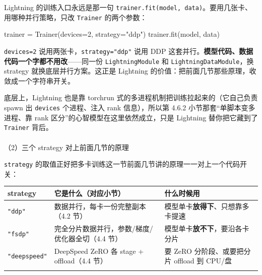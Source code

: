 \documentclass[
  chinese,
]{ctexart}
\makeatletter
\let\oldparagraph\paragraph
\renewcommand{\paragraph}{
    \@ifstar
      \xxxParagraphStar
      \xxxParagraphNoStar
  }
\newcommand{\xxxParagraphStar}[1]{\oldparagraph*{#1}\mbox{}}
\newcommand{\xxxParagraphNoStar}[1]{\oldparagraph{#1}\mbox{}}
\newenvironment{Shaded}{\begin{snugshade}}{\end{snugshade}}
\newcommand{\DecValTok}[1]{\textcolor[rgb]{0.68,0.00,0.00}{#1}}
\newcommand{\NormalTok}[1]{\textcolor[rgb]{0.00,0.23,0.31}{#1}}
\newcommand{\OperatorTok}[1]{\textcolor[rgb]{0.37,0.37,0.37}{#1}}
\newcommand{\StringTok}[1]{\textcolor[rgb]{0.13,0.47,0.30}{#1}}
\makeatother
\begin{document}
Lightning 的训练入口永远是那一句
\texttt{trainer.fit(model,\ data)}。要用几张卡、用哪种并行策略，只改
\texttt{Trainer} 的两个参数：

\begin{Shaded}
\begin{Highlighting}[]
\NormalTok{trainer }\OperatorTok{=}\NormalTok{ Trainer(devices}\OperatorTok{=}\DecValTok{2}\NormalTok{, strategy}\OperatorTok{=}\StringTok{"ddp"}\NormalTok{)}
\NormalTok{trainer.fit(model, data)}
\end{Highlighting}
\end{Shaded}

\texttt{devices=2} 说用两张卡，\texttt{strategy="ddp"} 说用 DDP
这套并行。\textbf{模型代码、数据代码一个字都不用改}------同一份
\texttt{LightningModule} 和 \texttt{LightningDataModule}，换 strategy
就换底层并行方案。这正是 Lightning
的价值：把前面几节那些原理，收敛成一个字符串开关。

底层上，Lightning 也是靠 torchrun
式的多进程机制把训练拉起来的（它自己负责 spawn 出 \texttt{devices}
个进程、注入 rank 信息），所以第 4.6.2 小节那套``单脚本变多进程、靠 rank
区分''的心智模型在这里依然成立，只是 Lightning 替你把它藏到了
\texttt{Trainer} 背后。

\paragraph{（2）三个 strategy
对上前面几节的原理}\label{ux4e09ux4e2a-strategy-ux5bf9ux4e0aux524dux9762ux51e0ux8282ux7684ux539fux7406}

\texttt{strategy}
的取值正好把多卡训练这一节前面几节讲的原理一一对上一个代码开关：

\begin{center}
\begin{tabular}{@{}>{\raggedright\arraybackslash}p{} >{\raggedright\arraybackslash}p{} >{\raggedright\arraybackslash}p{}@{}}
\toprule\noalign{}
strategy & 它是什么（对应小节） & 什么时候用 \\
\midrule\noalign{}
\texttt{"ddp"} & 数据并行，每卡一份完整副本（4.2 节） & 模型单卡\textbf{放得下}、只想靠多卡提速 \\
\texttt{"fsdp"} & 完全分片数据并行，参数/梯度/优化器全切（4.4 节） & 模型单卡\textbf{放不下}，要沿各卡分片 \\
\texttt{"deepspeed"} & DeepSpeed ZeRO 各 stage + offload（4.4 节） & 要 ZeRO 分阶段、或要把分片 offload 到 CPU/盘 \\
\bottomrule\noalign{}
\end{tabular}
\end{center}
\end{document}
